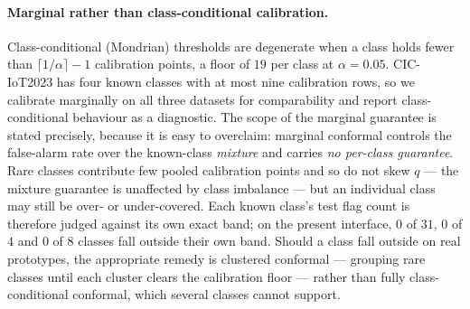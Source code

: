 \paragraph{Marginal rather than class-conditional calibration.}
Class-conditional (Mondrian) thresholds are degenerate when a class holds fewer than
$\lceil 1/\alpha \rceil - 1$ calibration points, a floor of $19$ per class at $\alpha = 0.05$. CIC-IoT2023
has four known classes with at most nine calibration rows, so we calibrate marginally on all three datasets
for comparability and report class-conditional behaviour as a diagnostic. The scope of the marginal
guarantee is stated precisely, because it is easy to overclaim: marginal conformal controls the false-alarm
rate over the known-class \emph{mixture} and carries \emph{no per-class guarantee}. Rare classes contribute
few pooled calibration points and so do not skew $q$ --- the mixture guarantee is unaffected by class
imbalance --- but an individual class may still be over- or under-covered. Each known class's test flag
count is therefore judged against its own exact band; on the present interface, $0$ of $31$, $0$ of $4$ and
$0$ of $8$ classes fall outside their own band. Should a class fall outside on real prototypes, the
appropriate remedy is clustered conformal --- grouping rare classes until each cluster clears the
calibration floor --- rather than fully class-conditional conformal, which several classes cannot support.

